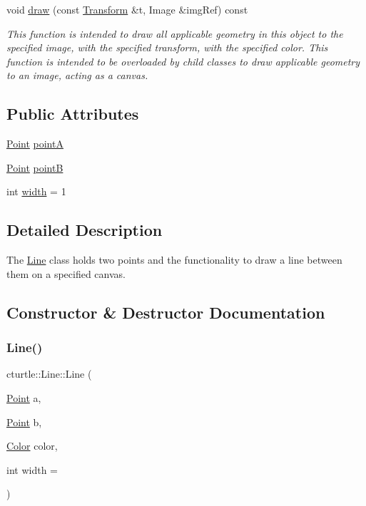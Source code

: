 \begin{DoxyCompactItemize}
void \hyperlink{classcturtle_1_1Line_a25ac5b4024bf9209d324b6f8c16affaf}{draw} (const \hyperlink{classcturtle_1_1Transform}{Transform} \&t, Image \&img\+Ref) const
\begin{DoxyCompactList}\small\item\em This function is intended to draw all applicable geometry in this object to the specified image, with the specified transform, with the specified color. This function is intended to be overloaded by child classes to draw applicable geometry to an image, acting as a canvas. \end{DoxyCompactList}\end{DoxyCompactItemize}
\subsection*{Public Attributes}
\begin{DoxyCompactItemize}
\item 
\hyperlink{structcturtle_1_1ivec2}{Point} \hyperlink{classcturtle_1_1Line_aca3d9298f4dc790552ed6515e2880ed8}{pointA}
\item 
\hyperlink{structcturtle_1_1ivec2}{Point} \hyperlink{classcturtle_1_1Line_a138b108f3a3531c4f7f72a8e26a16fcf}{pointB}
\item 
int \hyperlink{classcturtle_1_1Line_ae0c426af211fc443b7ad2bed4c30050b}{width} = 1
\end{DoxyCompactItemize}


\subsection{Detailed Description}
The \hyperlink{classcturtle_1_1Line}{Line} class holds two points and the functionality to draw a line between them on a specified canvas. 

\subsection{Constructor \& Destructor Documentation}
\mbox{\label{classcturtle_1_1Line_ae08d302308c4b10cc714508b2acca228}} 
\subsubsection{\texorpdfstring{Line()}{Line()}\hspace{0.1cm}{\footnotesize\ttfamily [1/2]}}
{\footnotesize\ttfamily cturtle\+::\+Line\+::\+Line (\begin{DoxyParamCaption}\item[{\hyperlink{structcturtle_1_1ivec2}{Point}}]{a,  }\item[{\hyperlink{structcturtle_1_1ivec2}{Point}}]{b,  }\item[{\hyperlink{classcturtle_1_1Color}{Color}}]{color,  }\item[{int}]{width = {} }\end{DoxyParamCaption})\hspace{0.3cm}{\ttfamily [inline]}}



